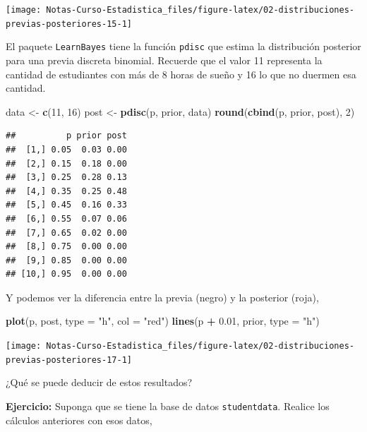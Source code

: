 \documentclass[
  12pt,
]{book}
\newenvironment{Shaded}{\begin{snugshade}}{\end{snugshade}}
\newcommand{\DataTypeTok}[1]{\textcolor[rgb]{0.13,0.29,0.53}{#1}}
\newcommand{\DecValTok}[1]{\textcolor[rgb]{0.00,0.00,0.81}{#1}}
\newcommand{\FloatTok}[1]{\textcolor[rgb]{0.00,0.00,0.81}{#1}}
\newcommand{\KeywordTok}[1]{\textcolor[rgb]{0.13,0.29,0.53}{\textbf{#1}}}
\newcommand{\NormalTok}[1]{#1}
\newcommand{\OperatorTok}[1]{\textcolor[rgb]{0.81,0.36,0.00}{\textbf{#1}}}
\newcommand{\StringTok}[1]{\textcolor[rgb]{0.31,0.60,0.02}{#1}}
\begin{document}
\begin{center}\texttt{[image: Notas-Curso-Estadistica\_files/figure-latex/02-distribuciones-previas-posteriores-15-1]} \end{center}

El paquete \texttt{LearnBayes} tiene la función \texttt{pdisc} que estima la distribución posterior para una previa discreta binomial. Recuerde que el valor 11 representa la cantidad de estudiantes con más de 8 horas de sueño y 16 lo que no duermen esa cantidad.

\begin{Shaded}
\begin{Highlighting}[]
\NormalTok{data \textless{}{-}}\StringTok{ }\KeywordTok{c}\NormalTok{(}\DecValTok{11}\NormalTok{, }\DecValTok{16}\NormalTok{)}
\NormalTok{post \textless{}{-}}\StringTok{ }\KeywordTok{pdisc}\NormalTok{(p, prior, data)}
\KeywordTok{round}\NormalTok{(}\KeywordTok{cbind}\NormalTok{(p, prior, post), }\DecValTok{2}\NormalTok{)}
\end{Highlighting}
\end{Shaded}

\begin{verbatim}
##          p prior post
##  [1,] 0.05  0.03 0.00
##  [2,] 0.15  0.18 0.00
##  [3,] 0.25  0.28 0.13
##  [4,] 0.35  0.25 0.48
##  [5,] 0.45  0.16 0.33
##  [6,] 0.55  0.07 0.06
##  [7,] 0.65  0.02 0.00
##  [8,] 0.75  0.00 0.00
##  [9,] 0.85  0.00 0.00
## [10,] 0.95  0.00 0.00
\end{verbatim}

Y podemos ver la diferencia entre la previa (negro) y la posterior (roja),

\begin{Shaded}
\begin{Highlighting}[]
\KeywordTok{plot}\NormalTok{(p, post, }\DataTypeTok{type =} \StringTok{"h"}\NormalTok{, }\DataTypeTok{col =} \StringTok{"red"}\NormalTok{)}
\KeywordTok{lines}\NormalTok{(p }\OperatorTok{+}\StringTok{ }\FloatTok{0.01}\NormalTok{, prior, }\DataTypeTok{type =} \StringTok{"h"}\NormalTok{)}
\end{Highlighting}
\end{Shaded}

\begin{center}\texttt{[image: Notas-Curso-Estadistica\_files/figure-latex/02-distribuciones-previas-posteriores-17-1]} \end{center}

¿Qué se puede deducir de estos resultados?

\textbf{Ejercicio:} Suponga que se tiene la base de datos \texttt{studentdata}. Realice los cálculos anteriores con esos datos,
\end{document}
